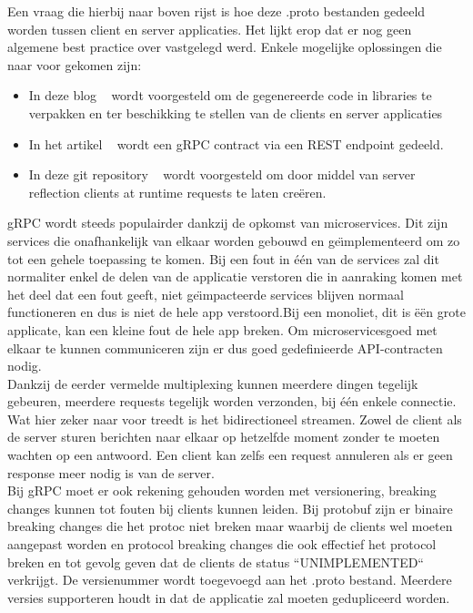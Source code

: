 Een vraag die hierbij naar boven rijst is hoe deze .proto bestanden gedeeld worden tussen client en server applicaties.
Het lijkt erop dat er nog geen algemene best practice over vastgelegd werd. Enkele mogelijke oplossingen
die naar voor gekomen zijn:
\begin{itemize}
    \item In deze blog ~\parencite{protofilesharingSol1} wordt voorgesteld om de gegenereerde code in libraries te verpakken en ter beschikking te stellen van de clients en server applicaties
    \item In het artikel ~\parencite{protofilesharingSol2} wordt een gRPC contract via een REST endpoint gedeeld.
    \item In deze git repository ~\parencite{protofilesharingSol3} wordt voorgesteld om door middel van server reflection clients at runtime requests te laten cre\"eren.
\end{itemize}

gRPC wordt steeds populairder dankzij de opkomst van microservices. Dit zijn services die onafhankelijk van elkaar worden gebouwd en ge\"{\i}mplementeerd om
zo tot een gehele toepassing te komen. Bij een fout in \'e\'en van de services zal dit normaliter enkel de delen van de applicatie verstoren die in aanraking komen
met het deel dat een fout geeft, niet ge\"{\i}mpacteerde services blijven normaal functioneren en dus is niet de hele app verstoord.Bij een monoliet, dit is \"e\"en grote applicate,
kan een kleine fout de hele app breken. Om microservicesgoed met elkaar te kunnen communiceren zijn er dus goed gedefinieerde API-contracten nodig.\newline
~\autocite{microsoft}\\

Dankzij de eerder vermelde multiplexing kunnen meerdere dingen tegelijk gebeuren, meerdere requests tegelijk worden verzonden, bij \'e\'en enkele connectie.
Wat hier zeker naar voor treedt is het bidirectioneel streamen. Zowel de client als de server sturen berichten naar elkaar op hetzelfde moment zonder te moeten wachten
op een antwoord. Een client kan zelfs een request annuleren als er geen response meer nodig is van de server.\newline
~\autocite{freecodecamp}\\

Bij gRPC moet er ook rekening gehouden worden met versionering, breaking changes kunnen tot fouten bij clients kunnen leiden.
Bij protobuf zijn er binaire breaking changes die het protoc niet breken maar waarbij de clients wel moeten aangepast worden en protocol breaking changes
die ook effectief het protocol breken en tot gevolg geven dat de clients de status ``UNIMPLEMENTED`` verkrijgt. De versienummer wordt toegevoegd aan
het .proto bestand. Meerdere versies supporteren houdt in dat de applicatie zal moeten gedupliceerd worden.\\

